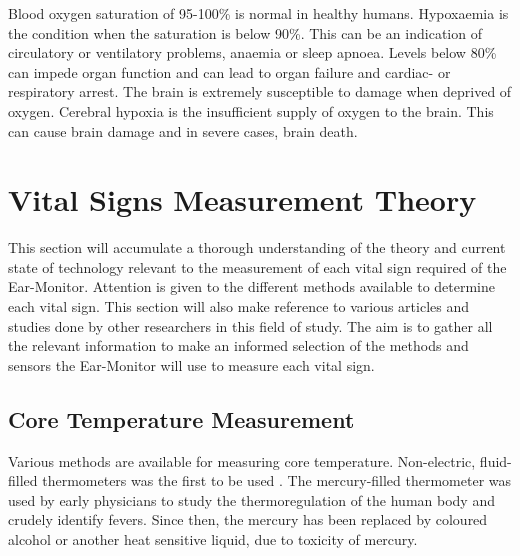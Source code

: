 \medskip
Blood oxygen saturation of 95-100\% is normal in healthy humans. Hypoxaemia is the condition when the saturation is below 90\%. This can be an indication of circulatory or ventilatory problems, anaemia or sleep apnoea. Levels below 80\% can impede organ function and can lead to organ failure and cardiac- or respiratory arrest. The brain is extremely susceptible to damage when deprived of oxygen. Cerebral hypoxia is the insufficient supply of oxygen to the brain. This can cause brain damage and in severe cases, brain death.




%



\section{Vital Signs Measurement Theory}
This section will accumulate a thorough understanding of the theory and current state of technology relevant to the measurement of each vital sign required of the Ear-Monitor. Attention is given to the different methods available to determine each vital sign. This section will also make reference to various articles and studies done by other researchers in this field of study. The aim is to gather all the relevant information to make an informed selection of the methods and sensors the Ear-Monitor will use to measure each vital sign.

\subsection{Core Temperature Measurement}
Various methods are available for measuring core temperature. Non-electric, fluid-filled thermometers was the first to be used \citep{pearce2002brief}. The mercury-filled thermometer was used by early physicians to study the thermoregulation of the human body and crudely identify fevers. Since then, the mercury has been replaced by coloured alcohol or another heat sensitive liquid, due to toxicity of mercury.


